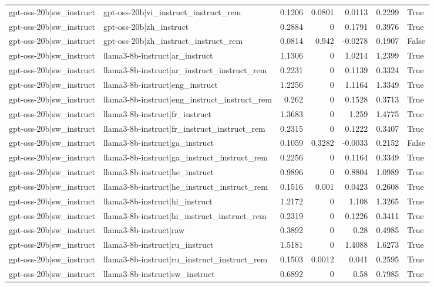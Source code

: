 \begin{table}
\begin{tabular}{l l r r r r l}
gpt-oss-20b|sw_instruct & gpt-oss-20b|vi_instruct_instruct_rem & 0.1206 & 0.0801 & 0.0113 & 0.2299 & True \\
gpt-oss-20b|sw_instruct & gpt-oss-20b|zh_instruct & 0.2884 & 0 & 0.1791 & 0.3976 & True \\
gpt-oss-20b|sw_instruct & gpt-oss-20b|zh_instruct_instruct_rem & 0.0814 & 0.942 & -0.0278 & 0.1907 & False \\
gpt-oss-20b|sw_instruct & llama3-8b-instruct|ar_instruct & 1.1306 & 0 & 1.0214 & 1.2399 & True \\
gpt-oss-20b|sw_instruct & llama3-8b-instruct|ar_instruct_instruct_rem & 0.2231 & 0 & 0.1139 & 0.3324 & True \\
gpt-oss-20b|sw_instruct & llama3-8b-instruct|eng_instruct & 1.2256 & 0 & 1.1164 & 1.3349 & True \\
gpt-oss-20b|sw_instruct & llama3-8b-instruct|eng_instruct_instruct_rem & 0.262 & 0 & 0.1528 & 0.3713 & True \\
gpt-oss-20b|sw_instruct & llama3-8b-instruct|fr_instruct & 1.3683 & 0 & 1.259 & 1.4775 & True \\
gpt-oss-20b|sw_instruct & llama3-8b-instruct|fr_instruct_instruct_rem & 0.2315 & 0 & 0.1222 & 0.3407 & True \\
gpt-oss-20b|sw_instruct & llama3-8b-instruct|ga_instruct & 0.1059 & 0.3282 & -0.0033 & 0.2152 & False \\
gpt-oss-20b|sw_instruct & llama3-8b-instruct|ga_instruct_instruct_rem & 0.2256 & 0 & 0.1164 & 0.3349 & True \\
gpt-oss-20b|sw_instruct & llama3-8b-instruct|he_instruct & 0.9896 & 0 & 0.8804 & 1.0989 & True \\
gpt-oss-20b|sw_instruct & llama3-8b-instruct|he_instruct_instruct_rem & 0.1516 & 0.001 & 0.0423 & 0.2608 & True \\
gpt-oss-20b|sw_instruct & llama3-8b-instruct|hi_instruct & 1.2172 & 0 & 1.108 & 1.3265 & True \\
gpt-oss-20b|sw_instruct & llama3-8b-instruct|hi_instruct_instruct_rem & 0.2319 & 0 & 0.1226 & 0.3411 & True \\
gpt-oss-20b|sw_instruct & llama3-8b-instruct|raw & 0.3892 & 0 & 0.28 & 0.4985 & True \\
gpt-oss-20b|sw_instruct & llama3-8b-instruct|ru_instruct & 1.5181 & 0 & 1.4088 & 1.6273 & True \\
gpt-oss-20b|sw_instruct & llama3-8b-instruct|ru_instruct_instruct_rem & 0.1503 & 0.0012 & 0.041 & 0.2595 & True \\
gpt-oss-20b|sw_instruct & llama3-8b-instruct|sw_instruct & 0.6892 & 0 & 0.58 & 0.7985 & True \\

\end{tabular}
\end{table}
